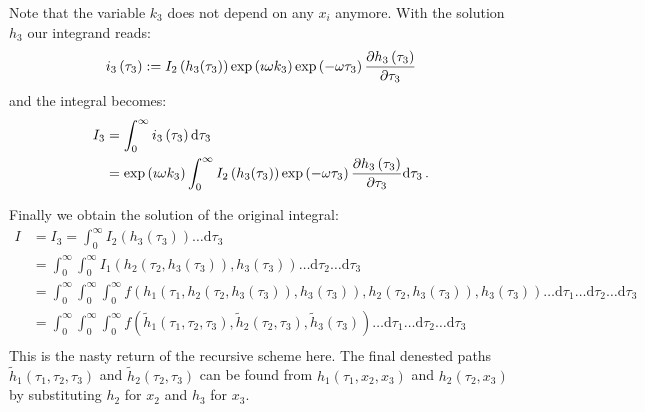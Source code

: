 \documentclass[a4paper,10pt]{article}
\begin{document}
Note that the variable $k_3$ does not depend on any $x_i$ anymore.
With the solution $h_3$ our integrand reads:
\begin{equation}
 i_3\left(\tau_3\right) := I_2\left(h_3(\tau_3)\right) \exp\left(\imath \omega k_3 \right)
                           \exp\left(- \omega \tau_3 \right) \frac{\partial h_3\left(\tau_3\right)}{\partial \tau_3}
\end{equation}
and the integral becomes:
\begin{equation}
\begin{split}
  I_3 & = \int_0^{\infty} i_3\left(\tau_3\right) \mathrm{d}\tau_3 \\
      & = \exp\left(\imath \omega k_3\right)
          \int_0^{\infty} I_2\left(h_3(\tau_3)\right)
                          \exp\left(- \omega \tau_3 \right)
                          \frac{\partial h_3\left(\tau_3\right)}{\partial \tau_3}
          \mathrm{d}\tau_3 \,.
\end{split}
\end{equation}

Finally we obtain the solution of the original integral:
\begin{equation*}
\begin{split}
  I & = I_3 = \int_0^{\infty} I_2\left(h_3(\tau_3)\right) \ldots \mathrm{d}\tau_3 \\
    & = \int_0^{\infty}
          \int_0^{\infty} I_1\left(h_2(\tau_2, h_3(\tau_3)), h_3(\tau_3)\right)
          \ldots \mathrm{d}\tau_2
        \ldots \mathrm{d}\tau_3 \\
    & = \int_0^{\infty}
          \int_0^{\infty}
            \int_0^{\infty} f\left(h_1(\tau_1, h_2(\tau_2, h_3(\tau_3)), h_3(\tau_3)),
                                   h_2(\tau_2, h_3(\tau_3)),
                                   h_3(\tau_3)
                             \right)
            \ldots \mathrm{d}\tau_1
          \ldots \mathrm{d}\tau_2
        \ldots \mathrm{d}\tau_3 \\
    & = \int_0^{\infty}
          \int_0^{\infty}
            \int_0^{\infty} f\left(\tilde{h}_1(\tau_1, \tau_2, \tau_3),
                                   \tilde{h}_2(\tau_2, \tau_3),
                                   \tilde{h}_3(\tau_3)
                             \right)
            \ldots \mathrm{d}\tau_1
          \ldots \mathrm{d}\tau_2
        \ldots \mathrm{d}\tau_3 \\
\end{split}
\end{equation*}
This is the nasty return of the recursive scheme here.
The final denested paths $\tilde{h}_1\left(\tau_1, \tau_2, \tau_3\right)$ and
$\tilde{h}_2\left(\tau_2, \tau_3\right)$ can be found from
$h_1\left(\tau_1, x_2, x_3\right)$ and $h_2\left(\tau_2, x_3\right)$
by substituting $h_2$ for $x_2$ and $h_3$ for $x_3$.
\end{document}
